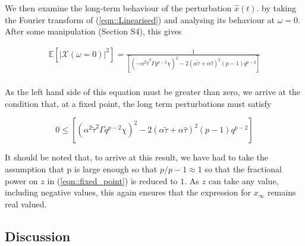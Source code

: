 \documentclass[sigconf,anonymous]{aamas}
\newcommand{\ttau}{\tilde{\tau}}
\newcommand{\htau}{\hat{\tau}}
\newcommand{\xfixed}{x_\infty}
\newcommand{\xpert}{\hat{x}(t)}
\begin{document}
We then examine the
long-term behaviour of the perturbation $\xpert$. by taking
the Fourier transform of (\ref{eqn::Linearised}) and analysing its
behaviour at $\omega = 0$. After some manipulation (Section S4), this gives

\begin{equation}
\begin{split}
        \mathbb{E}[|\mathcal{X}(\omega = 0)|^2] = \frac{1}{\left[ (-\alpha^2 \ttau^2 \Gamma q^{p-2} \chi)^2 - 2 (\alpha \ttau + \alpha \htau)^2 (p-1)q^{p-2}\right]} \\
\end{split}
\end{equation}

As the left hand side of this equation must be greater than zero, we arrive at the condition that, at a fixed point, the long term perturbations must satisfy

\begin{equation}
    \label{eqn::Final}
    0 \leq \left [(\alpha^2 \ttau^2 \Gamma q^{p-2} \chi)^{2} - 2 (\alpha \ttau + \alpha \htau)^2 (p-1)q^{p-2} \right ]
\end{equation}

It should be noted that, to arrive at this result, we have had to take the assumption that p is large enough so that $p/p-1 \approx 1$ so that the fractional power on $z$ in (\ref{eqn::fixed_point}) is reduced to $1$. As $z$ can take any value, including negative values, this again ensures that the expression for $\xfixed$ remains real valued.

\subsection{Discussion}
\end{document}
